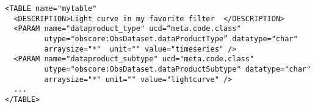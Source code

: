 \noindent
\begingroup\footnotesize
\begin{tcolorbox}
\begin{verbatim}
<TABLE name="mytable" 
  <DESCRIPTION>Light curve in my favorite filter  </DESCRIPTION>
  <PARAM name="dataproduct_type" ucd=“meta.code.class" 
         utype="obscore:ObsDataset.dataProductType” datatype="char" 
         arraysize="*"  unit="" value="timeseries" />
  <PARAM name="dataproduct_subtype" ucd="meta.code.class" 
         utype="obscore:ObsDataset.dataProductSubtype" datatype="char" 
         arraysize="*" unit="" value="lightcurve" />
  ... 
</TABLE>
\end{verbatim}
\end{tcolorbox}
\endgroup

